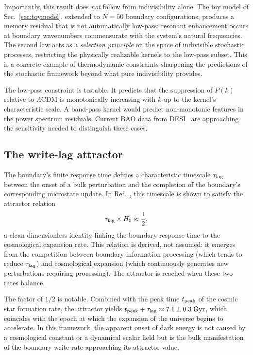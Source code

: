 \documentclass[aps,prd,twocolumn,superscriptaddress,nofootinbib]{revtex4-2}
\begin{document}
Importantly, this result does \emph{not} follow from indivisibility alone. The toy model of Sec.~\ref{sec:toymodel}, extended to $N = 50$ boundary configurations, produces a memory residual that is not automatically low-pass: resonant enhancement occurs at boundary wavenumbers commensurate with the system's natural frequencies. The second law acts as a \emph{selection principle} on the space of indivisible stochastic processes, restricting the physically realizable kernels to the low-pass subset. This is a concrete example of thermodynamic constraints sharpening the predictions of the stochastic framework beyond what pure indivisibility provides.

The low-pass constraint is testable. It predicts that the suppression of $P(k)$ relative to $\Lambda$CDM is monotonically increasing with $k$ up to the kernel's characteristic scale. A band-pass kernel would predict non-monotonic features in the power spectrum residuals. Current BAO data from DESI~\cite{DESI2024} are approaching the sensitivity needed to distinguish these cases.

\subsection{The write-lag attractor}

The boundary's finite response time defines a characteristic timescale $\tau_{\rm lag}$ between the onset of a bulk perturbation and the completion of the boundary's corresponding microstate update. In Ref.~\cite{PaperVII}, this timescale is shown to satisfy the attractor relation
\begin{equation}
\tau_{\rm lag} \times H_0 \approx \frac{1}{2},
\label{eq:writelag}
\end{equation}
a clean dimensionless identity linking the boundary response time to the cosmological expansion rate. This relation is derived, not assumed: it emerges from the competition between boundary information processing (which tends to reduce $\tau_{\rm lag}$) and cosmological expansion (which continuously generates new perturbations requiring processing). The attractor is reached when these two rates balance.

The factor of $1/2$ is notable. Combined with the peak time $t_{\rm peak}$ of the cosmic star formation rate, the attractor yields $t_{\rm peak} + \tau_{\rm lag} \approx 7.1 \pm 0.3\;\text{Gyr}$, which coincides with the epoch at which the expansion of the universe begins to accelerate. In this framework, the apparent onset of dark energy is not caused by a cosmological constant or a dynamical scalar field but is the bulk manifestation of the boundary write-rate approaching its attractor value.
\end{document}

